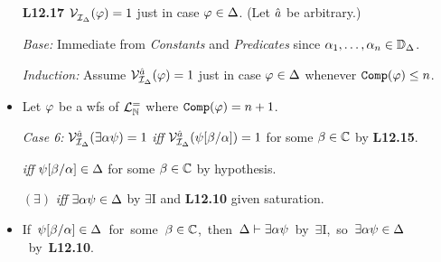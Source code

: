 \documentclass[a4paper, 11pt]{article} %
\begin{document}
\begin{itemize}
  \item[\bf L12.17] $\mathcal{V}_{\mathcal{I}_{\Delta}}^{}(\varphi)=1$ just in case $\varphi\in\Delta$. (Let $\hat{a}$ be arbitrary.)
  \item[\it Base:] Immediate from \textit{Constants} and \textit{Predicates} since $\alpha_1,\ldots,\alpha_n \in \mathbb{D}_{\Delta}$.
  \item[\it Induction:] Assume $\mathcal{V}_{\mathcal{I}_{\Delta}}^{\hat{a}}(\varphi)=1$ just in case $\varphi\in\Delta$ whenever $\texttt{Comp}(\varphi)\leq n$.
  \item Let $\varphi$ be a wfs of $\mathcal{L}^{=}_{\mathbb{N}}$ where $\texttt{Comp}(\varphi)=n+1$.
  \item[\it Case 6:] $\mathcal{V}_{\mathcal{I}_{\Delta}}^{\hat{a}}(\exists \alpha\psi)=1$  \textit{iff} $\mathcal{V}_{\mathcal{I}_{\Delta}}^{\hat{a}}(\psi[\beta/\alpha])=1$ for some $\beta\in\mathbb{C}$ by \textbf{L12.15}.
    \item[] \strut\hspace{.91in}  \textit{iff} $\psi[\beta/\alpha]\in\Delta$ for some $\beta\in\mathbb{C}$ by hypothesis.
    \item[] $(\exists)$ \hspace{.66in} \textit{iff} $\exists \alpha\psi\in\Delta$ by $\exists$I and \textbf{L12.10} given saturation.  
    \item \mbox{If $\psi[\beta/\alpha]\in\Delta$ for some $\beta\in\mathbb{C}$, then $\Delta\vdash \exists \alpha\psi$ by $\exists$I, so $\exists \alpha\psi\in\Delta$ by \textbf{L12.10}.}

\end{itemize}
\end{document}
